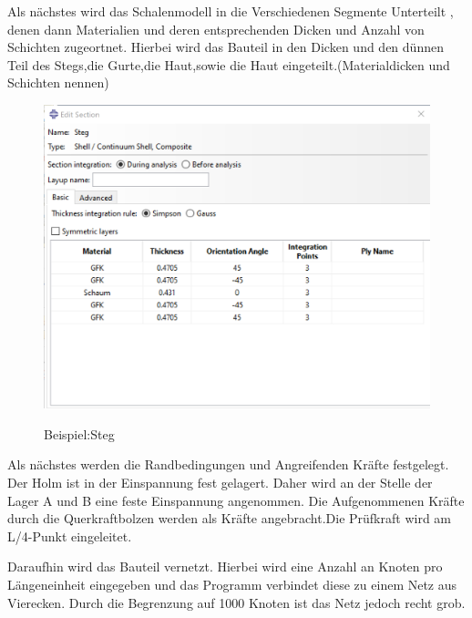 Als nächstes wird das Schalenmodell in die Verschiedenen Segmente Unterteilt , denen dann Materialien und deren entsprechenden Dicken und Anzahl von Schichten zugeortnet. Hierbei wird das Bauteil in den Dicken und den dünnen Teil des Stegs,die Gurte,die Haut,sowie die Haut eingeteilt.(Materialdicken und Schichten nennen)
\begin{figure}[h]
 \centering
 \includegraphics[scale=0.4]{Bilder/Steg_Material}\\
 \label{Steg_Material}
 \caption{Beispiel:Steg}
\end{figure}
Als nächstes werden die Randbedingungen und Angreifenden Kräfte festgelegt. Der Holm ist in der Einspannung fest gelagert. Daher wird an der Stelle der Lager A und B eine feste Einspannung angenommen. Die Aufgenommenen Kräfte durch die Querkraftbolzen werden als Kräfte angebracht.Die Prüfkraft wird am L/4-Punkt eingeleitet.

Daraufhin wird das Bauteil vernetzt. Hierbei wird eine Anzahl an Knoten pro Längeneinheit eingegeben und das Programm verbindet diese zu einem Netz aus Vierecken. Durch die Begrenzung auf 1000 Knoten ist das Netz jedoch recht grob. \\
\newpage
